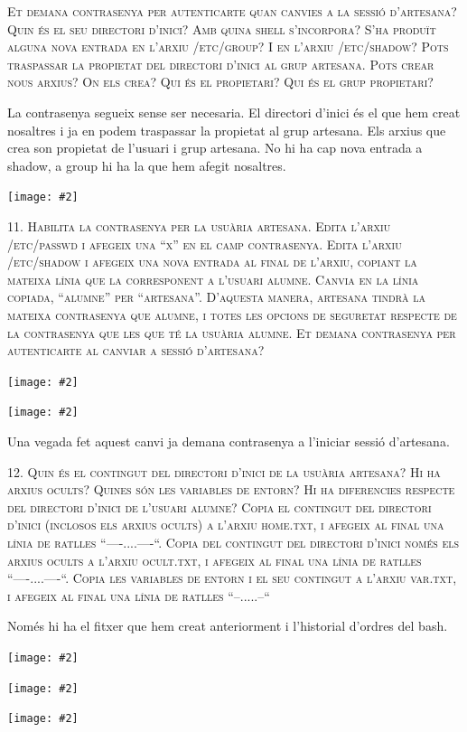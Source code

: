 \documentclass[a4paper,12pt]{article}
\newcommand{\mygraphic}[2][width=\textwidth]{\begin{center}
		\centering\texttt{[image: \#2]}\par
\end{center}}
\begin{document}
\textsc{Et demana contrasenya per autenticarte quan canvies a la sessió d’artesana? Quin és el seu directori d’inici? Amb quina shell s’incorpora? S’ha produït alguna nova entrada en l’arxiu \linebreak /etc/group? I en l’arxiu /etc/shadow? Pots traspassar la propietat del directori d’inici al grup artesana. Pots crear nous arxius? On els crea? Qui és el propietari? Qui és el grup propietari?}

La contrasenya segueix sense ser necesaria. El directori d'inici és el que hem creat nosaltres i ja en podem traspassar la propietat al grup artesana. Els arxius que crea son propietat de l'usuari i grup artesana. No hi ha cap nova entrada a shadow, a group hi ha la que hem afegit nosaltres.
\mygraphic{imatges/10b.png}

\newpage
\textsc{11. Habilita la contrasenya per la usuària artesana. Edita l’arxiu /etc/passwd i afegeix una “x” en el camp contrasenya. Edita l’arxiu /etc/shadow i afegeix una nova entrada al final de l’arxiu, copiant la mateixa línia que la corresponent a l’usuari alumne. Canvia en la línia copiada, “alumne” per “artesana”. D’aquesta manera, artesana tindrà la mateixa contrasenya que alumne, i totes les opcions de seguretat respecte de la contrasenya que les que té la usuària alumne. Et demana contrasenya per autenticarte al canviar a sessió d’artesana?}
\mygraphic{imatges/11a.png}
\mygraphic{imatges/11b.png}

Una vegada fet aquest canvi ja demana contrasenya a l'iniciar sessió d'artesana.

\newpage
\textsc{12. Quin és el contingut del directori d’inici de la usuària artesana? Hi ha arxius ocults? Quines són les variables de entorn? Hi ha diferencies respecte del directori d’inici de l’usuari alumne? Copia el contingut del directori d’inici (inclosos els arxius ocults) a l’arxiu home.txt, i afegeix al final una línia de ratlles “----....----“. Copia del contingut del directori d’inici només els arxius ocults a l’arxiu ocult.txt, i afegeix al final una línia de ratlles “----....----“. Copia les variables de entorn i el seu contingut a l’arxiu var.txt, i afegeix al final una línia de ratlles “--.....--“}

Només hi ha el fitxer que hem creat anteriorment i l'historial d'ordres del bash.
\mygraphic{imatges/12a.png}
\mygraphic{imatges/12b.png}
\mygraphic{imatges/12c.png}
\end{document}

